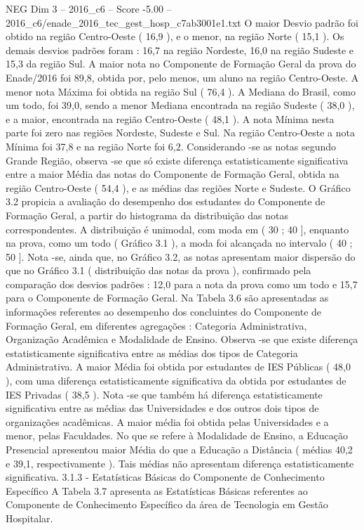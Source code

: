\begin{textsample}{NEG Dim 3 – 2016\_c6 – Score -5.00 – 2016\_c6/enade\_2016\_tec\_gest\_hosp\_c7ab3001e1.txt}
O maior Desvio padrão foi obtido na região Centro-Oeste ( 16,9 ), e o menor, na região Norte ( 15,1 ).
Os demais desvios padrões foram : 16,7 na região Nordeste, 16,0 na região Sudeste e 15,3 da região Sul.
A maior nota no Componente de Formação Geral da prova do Enade/2016 foi 89,8, obtida por, pelo menos, um aluno na região Centro-Oeste.
A menor nota Máxima foi obtida na região Sul ( 76,4 ).
A Mediana do Brasil, como um todo, foi 39,0, sendo a menor Mediana encontrada na região Sudeste ( 38,0 ), e a maior, encontrada na região Centro-Oeste ( 48,1 ).
A nota Mínima nesta parte foi zero nas regiões Nordeste, Sudeste e Sul.
Na região Centro-Oeste a nota Mínima foi 37,8 e na região Norte foi 6,2.
Considerando -se as notas segundo Grande Região, observa -se que só existe diferença estatisticamente significativa entre a maior Média das notas do Componente de Formação Geral, obtida na região Centro-Oeste ( 54,4 ), e as médias das regiões Norte e Sudeste.
O Gráfico 3.2 propicia a avaliação do desempenho dos estudantes do Componente de Formação Geral, a partir do histograma da distribuição das notas correspondentes.
A distribuição é unimodal, com moda em ( 30 ; 40 ], enquanto na prova, como um todo ( Gráfico 3.1 ), a moda foi alcançada no intervalo ( 40 ; 50 ].
Nota -se, ainda que, no Gráfico 3.2, as notas apresentam maior dispersão do que no Gráfico 3.1 ( distribuição das notas da prova ), confirmado pela comparação dos desvios padrões : 12,0 para a nota da prova como um todo e 15,7 para o Componente de Formação Geral.
Na Tabela 3.6 são apresentadas as informações referentes ao desempenho dos concluintes do Componente de Formação Geral, em diferentes agregações : Categoria Administrativa, Organização Acadêmica e Modalidade de Ensino.
Observa -se que existe diferença estatisticamente significativa entre as médias dos tipos de Categoria Administrativa.
A maior Média foi obtida por estudantes de IES Públicas ( 48,0 ), com uma diferença estatisticamente significativa da obtida por estudantes de IES Privadas ( 38,5 ).
Nota -se que também há diferença estatisticamente significativa entre as médias das Universidades e dos outros dois tipos de organizações acadêmicas.
A maior média foi obtida pelas Universidades e a menor, pelas Faculdades.
No que se refere à Modalidade de Ensino, a Educação Presencial apresentou maior Média do que a Educação a Distância ( médias 40,2 e 39,1, respectivamente ).
Tais médias não apresentam diferença estatisticamente significativa. 3.1.3 - Estatísticas Básicas do Componente de Conhecimento Específico A Tabela 3.7 apresenta as Estatísticas Básicas referentes ao Componente de Conhecimento Específico da área de Tecnologia em Gestão Hospitalar.

\end{textsample}

